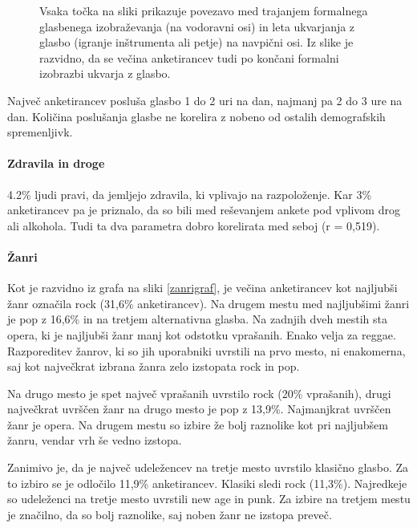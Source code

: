 \documentclass[a4paper, 12pt]{book}
\begin{document}
{\begin{figure}[hbt]
\caption{Vsaka točka na sliki prikazuje povezavo med trajanjem formalnega glasbenega izobraževanja (na vodoravni osi) in leta ukvarjanja z glasbo (igranje inštrumenta ali petje) na navpični osi.  Iz slike je razvidno, da se večina anketirancev tudi po končani formalni izobrazbi ukvarja z glasbo.  }
\label{ukvarjanjeglizobrazba}
\end{figure}

Največ anketirancev posluša glasbo 1 do 2 uri na dan, najmanj pa 2 do 3 ure na dan. Količina poslušanja glasbe ne korelira z nobeno od ostalih demografskih spremenljivk. 

\paragraph{Zdravila in droge}

4.2\% ljudi pravi, da jemljejo zdravila, ki vplivajo na razpoloženje. Kar 3\% anketirancev pa je priznalo, da so bili med reševanjem ankete pod vplivom drog ali alkohola. Tudi ta dva parametra dobro korelirata med seboj (r = 0,519).

\paragraph{Žanri}

Kot je razvidno iz grafa na sliki \ref{zanrigraf}, je večina anketirancev kot najljubši žanr označila rock (31,6\% anketirancev). Na drugem mestu med najljubšimi žanri je pop z 16,6\% in na tretjem alternativna glasba. Na zadnjih dveh mestih sta opera, ki je najljubši žanr manj kot odstotku vprašanih. Enako velja za reggae. Razporeditev žanrov, ki so jih uporabniki uvrstili na prvo mesto, ni enakomerna, saj kot največkrat izbrana žanra zelo izstopata rock in pop.  

Na drugo mesto je spet največ vprašanih uvrstilo rock (20\% vprašanih), drugi največkrat uvrščen žanr na drugo mesto je pop z 13,9\%. Najmanjkrat uvrščen žanr je opera. Na drugem mestu so izbire že bolj raznolike kot pri najljubšem žanru, vendar vrh še vedno izstopa. 

Zanimivo je, da je največ udeležencev na tretje mesto uvrstilo klasično glasbo. Za to izbiro se je odločilo 11,9\% anketirancev. Klasiki sledi rock (11,3\%). Najredkeje so udeleženci na tretje mesto uvrstili new age in punk. Za izbire na tretjem mestu je značilno, da so bolj raznolike, saj noben žanr ne izstopa preveč. 

}
\end{document}

